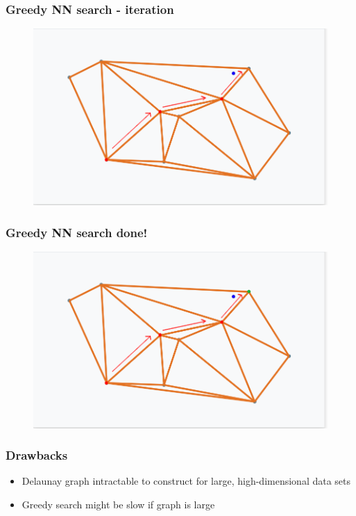 \documentclass{beamer}
\begin{document}
  \begin{frame}
    \frametitle{Greedy NN search - iteration}  
  \begin{figure}[greedy_search_start_new_step_3_1]
    \vspace*{-0.1cm}
  	\includegraphics[scale=0.3]{greedy_search_start_new_step_3_1} 	
  \end{figure} 
  \end{frame}         


  \begin{frame}
    \frametitle{Greedy NN search done!}  
  \begin{figure}[greedy_search_start_new_step_3_2]
    \vspace*{-0.1cm}
  	\includegraphics[scale=0.3]{greedy_search_start_new_step_3_2} 	
  \end{figure} 
  \end{frame}         

  \begin{frame}
    \frametitle{Drawbacks}  
   	\begin{itemize}
   	\Large
		\item Delaunay graph intractable to construct for large, high-dimensional data sets
		\item Greedy search might be slow if graph is large
	\end{itemize}   
  \end{frame}
\end{document}
